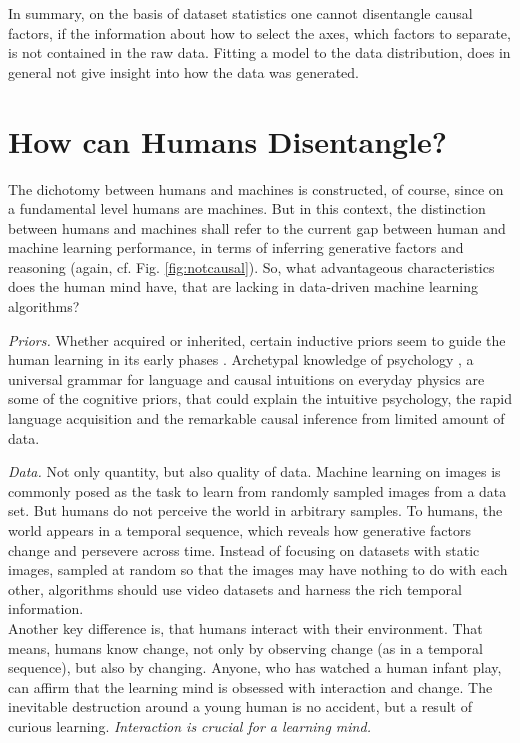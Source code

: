 	In summary, on the basis of dataset statistics one cannot disentangle causal factors, if the information about how to select the axes, \ie which factors to separate, is not contained in the raw data.
	Fitting a model to the data distribution, does in general not give insight into how the data was generated.

\section{How can Humans Disentangle?}
	The dichotomy between humans and machines is constructed, of course, since on a fundamental level humans are machines.
	But in this context, the distinction between humans and machines shall refer to the current gap between human and machine learning performance, in terms of inferring generative factors and reasoning (again, cf. Fig. \ref{fig:notcausal}).
	So, what advantageous characteristics does the human mind have, that are lacking in data-driven machine learning algorithms?

	\emph{Priors.}
		Whether acquired or inherited, certain inductive priors seem to guide the human learning in its early phases \cite{tenenbaum18think}.
		Archetypal knowledge of psychology \cite{jung68archetype}, a universal grammar for language \cite{chomsky00horizons} and causal intuitions on everyday physics \cite{teglas11intuitive} are some of the cognitive priors, that could explain the intuitive psychology, the rapid language acquisition and the remarkable causal inference from limited amount of data.

	\emph{Data.}
		Not only quantity, but also quality of data. Machine learning on images is commonly posed as the task to learn from randomly sampled images from a data set. But humans do not perceive the world in arbitrary samples.
		To humans, the world appears in a temporal sequence, which reveals how generative factors change and persevere across time. Instead of focusing on datasets with static images, sampled at random so that the images may have nothing to do with each other, algorithms should use video datasets and harness the rich temporal information.\\
		Another key difference is, that humans interact with their environment.
		That means, humans know change, not only by observing change (as in a temporal sequence), but also by changing.
		Anyone, who has watched a human infant play, can affirm that the learning mind is obsessed with interaction and change. The inevitable destruction around a young human is no accident, but a result of curious learning.
		\textit{Interaction is crucial for a learning mind.}

